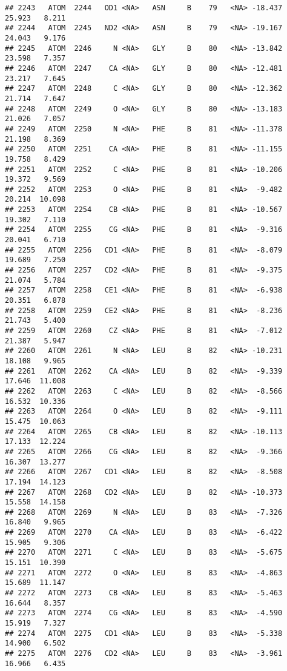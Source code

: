 \documentclass[
]{article}
\begin{document}
\begin{verbatim}
## 2243   ATOM  2244   OD1 <NA>   ASN     B    79   <NA> -18.437  25.923   8.211
## 2244   ATOM  2245   ND2 <NA>   ASN     B    79   <NA> -19.167  24.043   9.176
## 2245   ATOM  2246     N <NA>   GLY     B    80   <NA> -13.842  23.598   7.357
## 2246   ATOM  2247    CA <NA>   GLY     B    80   <NA> -12.481  23.217   7.645
## 2247   ATOM  2248     C <NA>   GLY     B    80   <NA> -12.362  21.714   7.647
## 2248   ATOM  2249     O <NA>   GLY     B    80   <NA> -13.183  21.026   7.057
## 2249   ATOM  2250     N <NA>   PHE     B    81   <NA> -11.378  21.198   8.369
## 2250   ATOM  2251    CA <NA>   PHE     B    81   <NA> -11.155  19.758   8.429
## 2251   ATOM  2252     C <NA>   PHE     B    81   <NA> -10.206  19.372   9.569
## 2252   ATOM  2253     O <NA>   PHE     B    81   <NA>  -9.482  20.214  10.098
## 2253   ATOM  2254    CB <NA>   PHE     B    81   <NA> -10.567  19.302   7.110
## 2254   ATOM  2255    CG <NA>   PHE     B    81   <NA>  -9.316  20.041   6.710
## 2255   ATOM  2256   CD1 <NA>   PHE     B    81   <NA>  -8.079  19.689   7.250
## 2256   ATOM  2257   CD2 <NA>   PHE     B    81   <NA>  -9.375  21.074   5.784
## 2257   ATOM  2258   CE1 <NA>   PHE     B    81   <NA>  -6.938  20.351   6.878
## 2258   ATOM  2259   CE2 <NA>   PHE     B    81   <NA>  -8.236  21.743   5.400
## 2259   ATOM  2260    CZ <NA>   PHE     B    81   <NA>  -7.012  21.387   5.947
## 2260   ATOM  2261     N <NA>   LEU     B    82   <NA> -10.231  18.108   9.965
## 2261   ATOM  2262    CA <NA>   LEU     B    82   <NA>  -9.339  17.646  11.008
## 2262   ATOM  2263     C <NA>   LEU     B    82   <NA>  -8.566  16.532  10.336
## 2263   ATOM  2264     O <NA>   LEU     B    82   <NA>  -9.111  15.475  10.063
## 2264   ATOM  2265    CB <NA>   LEU     B    82   <NA> -10.113  17.133  12.224
## 2265   ATOM  2266    CG <NA>   LEU     B    82   <NA>  -9.366  16.307  13.277
## 2266   ATOM  2267   CD1 <NA>   LEU     B    82   <NA>  -8.508  17.194  14.123
## 2267   ATOM  2268   CD2 <NA>   LEU     B    82   <NA> -10.373  15.558  14.158
## 2268   ATOM  2269     N <NA>   LEU     B    83   <NA>  -7.326  16.840   9.965
## 2269   ATOM  2270    CA <NA>   LEU     B    83   <NA>  -6.422  15.905   9.306
## 2270   ATOM  2271     C <NA>   LEU     B    83   <NA>  -5.675  15.151  10.390
## 2271   ATOM  2272     O <NA>   LEU     B    83   <NA>  -4.863  15.689  11.147
## 2272   ATOM  2273    CB <NA>   LEU     B    83   <NA>  -5.463  16.644   8.357
## 2273   ATOM  2274    CG <NA>   LEU     B    83   <NA>  -4.590  15.919   7.327
## 2274   ATOM  2275   CD1 <NA>   LEU     B    83   <NA>  -5.338  14.900   6.502
## 2275   ATOM  2276   CD2 <NA>   LEU     B    83   <NA>  -3.961  16.966   6.435

\end{verbatim}
\end{document}
